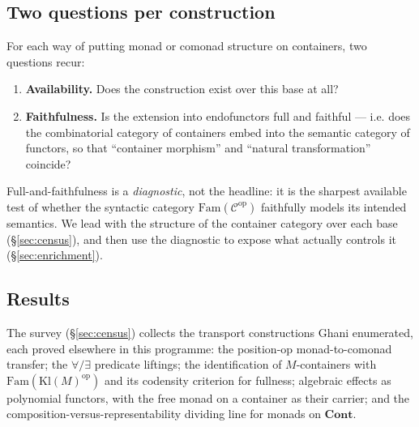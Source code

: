 \documentclass[11pt]{amsart}
\theoremstyle{plain}
\theoremstyle{definition}
\theoremstyle{remark}
\newcommand{\Cont}{\mathbf{Cont}}
\newcommand{\Fam}{\mathrm{Fam}}
\newcommand{\Kl}{\mathrm{Kl}}
\newcommand{\op}{\mathrm{op}}
\newcommand{\C}{\mathcal{C}}
\begin{document}
\subsection*{Two questions per construction}
For each way of putting monad or comonad structure on containers, two questions recur:
\begin{enumerate}[label=(\alph*),leftmargin=2.2em]
  \item \textbf{Availability.} Does the construction exist over this base at all?
  \item \textbf{Faithfulness.} Is the extension into endofunctors full and faithful --- i.e. does the
    combinatorial category of containers embed into the semantic category of functors, so that
    ``container morphism'' and ``natural transformation'' coincide?
\end{enumerate}
Full-and-faithfulness is a \emph{diagnostic}, not the headline: it is the sharpest available test of
whether the syntactic category $\Fam(\C^{\op})$ faithfully models its intended semantics. We lead with
the structure of the container category over each base (\S\ref{sec:census}), and then use the
diagnostic to expose what actually controls it (\S\ref{sec:enrichment}).

\subsection*{Results}
The survey (\S\ref{sec:census}) collects the transport constructions Ghani enumerated, each proved
elsewhere in this programme: the position-op monad-to-comonad transfer; the $\forall/\exists$
predicate liftings; the identification of $M$-containers with $\Fam(\Kl(M)^{\op})$ and its codensity
criterion for fullness; algebraic effects as polynomial functors, with the free monad on a container
as their carrier; and the composition-versus-representability dividing line for monads on $\Cont$.
\end{document}
